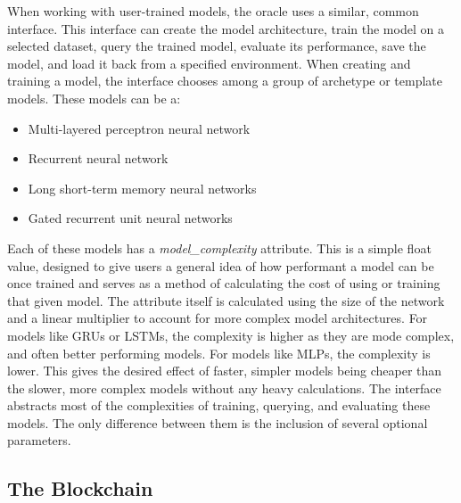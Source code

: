 \documentclass{article}
\begin{document}
    When working with user-trained models, the oracle uses a similar, common interface.  This interface can create the model
    architecture, train the model on a selected dataset, query the trained model, evaluate its performance, save the model,
    and load it back from a specified environment.  When creating and training a model, the interface chooses among a group
    of archetype or template models.  These models can be a:

    \begin{itemize}
        \item Multi-layered perceptron neural network
        \item Recurrent neural network
        \item Long short-term memory neural networks
        \item Gated recurrent unit neural networks
    \end{itemize}

    Each of these models has a \textit{model\_complexity} attribute.  This is a simple float value, designed to give users
    a general idea of how performant a model can be once trained and serves as a method of calculating the cost of using
    or training that given model.  The attribute itself is calculated using the size of the network and a linear multiplier to
    account for more complex model architectures.  For models like GRUs or LSTMs, the complexity is higher as they are mode complex, and often
    better performing models.  For models like MLPs, the complexity is lower.  This gives the desired effect of faster, simpler
    models being cheaper than the slower, more complex models without any heavy calculations.   The interface abstracts most
    of the complexities of training, querying, and evaluating these models.  The only difference between them is the inclusion
    of several optional parameters.

    \subsection{The Blockchain}
\end{document}
